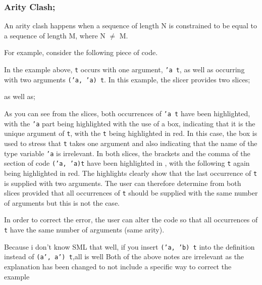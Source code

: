 \documentclass{report}
\begin{document}
\begin{itemize}
\newpage


\subsubsection{Arity Clash;}

  \subitem An arity clash happens when a sequence of length N is
  constrained to be equal to a sequence of length M, where N $\neq$ M.


For example, consider the following piece of code.


In the example above, \texttt{t} occurs with one argument,
\texttt{'a t}, as well as occurring with two arguments
\texttt{('a, 'a) t}. In this example, the slicer provides two
slices;


as well as;


As you can see from the slices, both occurrences of \texttt{'a
  t} have been highlighted, with the \texttt{'a} part being
highlighted with the use of a box, indicating that it is the unique
argument of \texttt{t}, with the \texttt{t} being
highlighted in red. In this case, the box is used to stress that
\texttt{t} takes one argument and also indicating that the name
of the type variable \texttt{'a} is irrelevant. In both slices,
the brackets and the comma of the section of code \texttt{('a,
  'a)t} have been highlighted in \tesEndPointOne, with the following
\texttt{t} again being highlighted in red. The \tesEndPointOne highlights
clearly show that the last occurrence of \texttt{t} is supplied
with two arguments. The user can therefore determine from both slices
provided that all occurrences of \texttt{t} should be supplied
with the same number of arguments but this is not the case.

In order to correct the error, the user can alter the code so that all
occurrences of \texttt{t} have the same number of arguments
(same arity).

{Because i don't know SML that well, if you
  insert \texttt{('a, 'b) t} into the definition instead of
  \texttt{(a', a') t},all is well}
{Both of the above notes are irrelevant as the
  explanation has been changed to not include a specific way to correct
the example}


\end{itemize}
\end{document}
